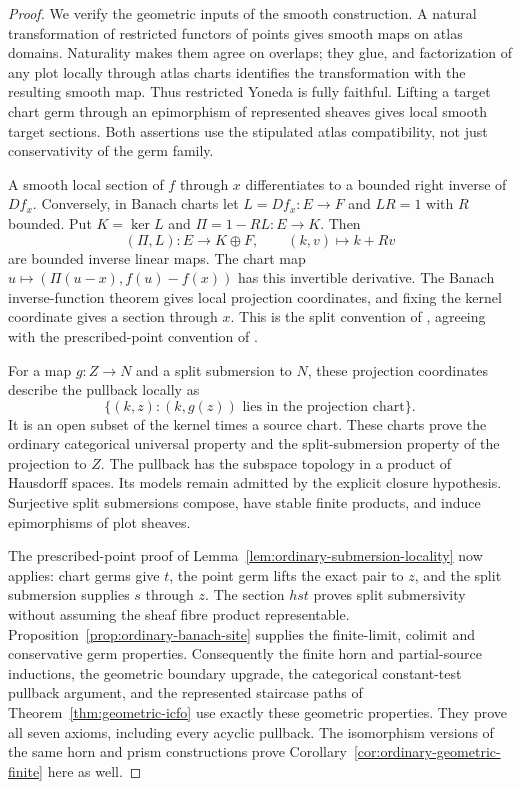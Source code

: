 \documentclass[12pt]{amsart}
\theoremstyle{definition}
\theoremstyle{remark}
\numberwithin{equation}{section}
\begin{document}
\begin{proof}
We verify the geometric inputs of the smooth construction.
A natural transformation of restricted functors of points
gives smooth maps on atlas domains. Naturality makes them
agree on overlaps; they glue, and factorization of any plot
locally through atlas charts identifies the transformation
with the resulting smooth map. Thus restricted Yoneda is
fully faithful. Lifting a target chart germ through an
epimorphism of represented sheaves gives local smooth
target sections. Both assertions use the stipulated atlas
compatibility, not just conservativity of the germ family.

A smooth local section of $f$ through $x$ differentiates
to a bounded right inverse of $Df_x$. Conversely, in
Banach charts let $L=Df_x:E\to F$ and $LR=1$ with $R$
bounded. Put $K=\ker L$ and $\Pi=1-RL:E\to K$. Then
\[
 (\Pi,L):E\longrightarrow K\oplus F,\qquad
 (k,v)\longmapsto k+Rv
\]
are bounded inverse linear maps. The chart map
$u\mapsto(\Pi(u-x),f(u)-f(x))$ has this invertible
derivative. The Banach inverse-function theorem gives
local projection coordinates, and fixing the kernel
coordinate gives a section through $x$.
This is the split convention of
\cite[Definition~1.4.1 and Lemma~1.4.3,
pp.~28--29]{Schmeding2021}, agreeing with the
prescribed-point convention of
\cite[p.~1146]{RogersZhu2020}.

For a map $g:Z\to N$ and a split submersion to $N$,
these projection coordinates describe the pullback locally as
\[
 \{(k,z):(k,g(z))\text{ lies in the projection chart}\}.
\]
It is an open subset of the kernel times a source chart.
These charts prove the ordinary categorical universal
property and the split-submersion property of the
projection to $Z$. The pullback has the subspace topology
in a product of Hausdorff spaces. Its models remain
admitted by the explicit closure hypothesis.
Surjective split submersions compose, have stable finite
products, and induce epimorphisms of plot sheaves.

The prescribed-point proof of
Lemma~\ref{lem:ordinary-submersion-locality} now applies:
chart germs give $t$, the point germ lifts the exact pair
to $z$, and the split submersion supplies $s$ through $z$.
The section $hst$ proves split submersivity without
assuming the sheaf fibre product representable.
Proposition~\ref{prop:ordinary-banach-site} supplies the
finite-limit, colimit and conservative germ properties.
Consequently the finite horn and partial-source inductions,
the geometric boundary upgrade, the categorical
constant-test pullback argument, and the represented
staircase paths of Theorem~\ref{thm:geometric-icfo} use
exactly these geometric properties.
They prove all seven axioms, including every acyclic
pullback. The isomorphism versions of the same horn
and prism constructions prove
Corollary~\ref{cor:ordinary-geometric-finite} here as well.


\end{proof}
\end{document}
